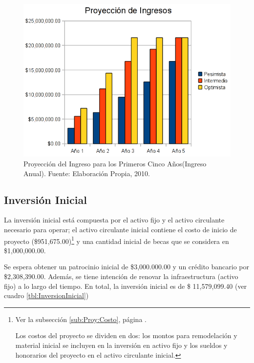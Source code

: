 \begin{figure}
	\centering
	\includegraphics[scale=0.7]{images/proyeccion_ingresos}
	\caption{Proyecci\'on del Ingreso para los Primeros Cinco Años\newline (Ingreso Anual). Fuente: Elaboración Propia, 2010.}
	\label{fig:ProyeccionIngresos}
\end{figure}

\subsection{Inversión Inicial}
\label{sub:oper:InversionInicial}

La inversión inicial está compuesta por el activo fijo y el activo circulante necesario para operar; el activo circulante inicial contiene el costo de inicio de proyecto (\$951,675.00)\footnote{Ver la subsección \ref{sub:Proy:Costo}, página \pageref{sub:Proy:Costo}.

Los costos del proyecto se dividen en dos: los montos para remodelación y material inicial se incluyen en la inversión en activo fijo y los sueldos y honorarios del proyecto en el activo circulante inicial.} y una cantidad inicial de becas que se considera en \$1,000,000.00.

Se espera obtener un patrocinio inicial de \$3,000.000.00 y un crédito bancario por \$2,308,390.00. Además, se tiene intención de renovar la infraestructura (activo fijo) a lo largo del tiempo. En total, la inversión inicial es de \$ 11,579,099.40 (ver cuadro \ref{tbl:InversionInicial})



